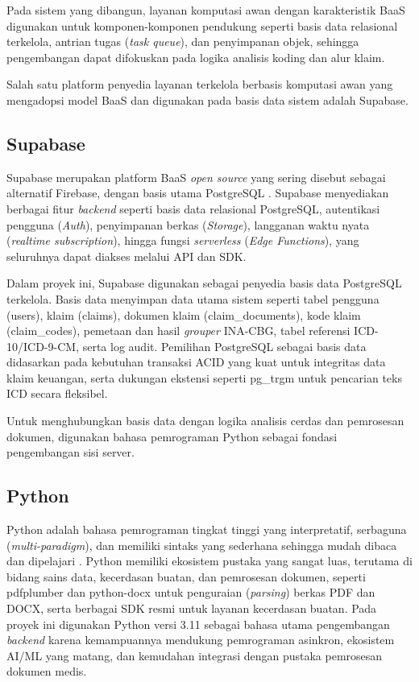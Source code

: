 Pada sistem yang dibangun, layanan komputasi awan dengan karakteristik BaaS digunakan untuk komponen-komponen pendukung seperti basis data relasional terkelola, antrian tugas (\textit{task queue}), dan penyimpanan objek, sehingga pengembangan dapat difokuskan pada logika analisis koding dan alur klaim.

Salah satu platform penyedia layanan terkelola berbasis komputasi awan yang mengadopsi model BaaS dan digunakan pada basis data sistem adalah Supabase.

\subsection{Supabase}
Supabase merupakan platform BaaS \textit{open source} yang sering disebut sebagai alternatif Firebase, dengan basis utama PostgreSQL \cite{28}. Supabase menyediakan berbagai fitur \textit{backend} seperti basis data relasional PostgreSQL, autentikasi pengguna (\textit{Auth}), penyimpanan berkas (\textit{Storage}), langganan waktu nyata (\textit{realtime subscription}), hingga fungsi \textit{serverless} (\textit{Edge Functions}), yang seluruhnya dapat diakses melalui API dan SDK.

Dalam proyek ini, Supabase digunakan sebagai penyedia basis data PostgreSQL terkelola. Basis data menyimpan data utama sistem seperti tabel pengguna (users), klaim (claims), dokumen klaim (claim\_documents), kode klaim (claim\_codes), pemetaan dan hasil \textit{grouper} INA-CBG, tabel referensi ICD-10/ICD-9-CM, serta log audit. Pemilihan PostgreSQL sebagai basis data didasarkan pada kebutuhan transaksi ACID yang kuat untuk integritas data klaim keuangan, serta dukungan ekstensi seperti pg\_trgm untuk pencarian teks ICD secara fleksibel.

Untuk menghubungkan basis data dengan logika analisis cerdas dan pemrosesan dokumen, digunakan bahasa pemrograman Python sebagai fondasi pengembangan sisi server.

\subsection{Python}
Python adalah bahasa pemrograman tingkat tinggi yang interpretatif, serbaguna (\textit{multi-paradigm}), dan memiliki sintaks yang sederhana sehingga mudah dibaca dan dipelajari \cite{27}. Python memiliki ekosistem pustaka yang sangat luas, terutama di bidang sains data, kecerdasan buatan, dan pemrosesan dokumen, seperti pdfplumber dan python-docx untuk penguraian (\textit{parsing}) berkas PDF dan DOCX, serta berbagai SDK resmi untuk layanan kecerdasan buatan. Pada proyek ini digunakan Python versi 3.11 sebagai bahasa utama pengembangan \textit{backend} karena kemampuannya mendukung pemrograman asinkron, ekosistem AI/ML yang matang, dan kemudahan integrasi dengan pustaka pemrosesan dokumen medis.

